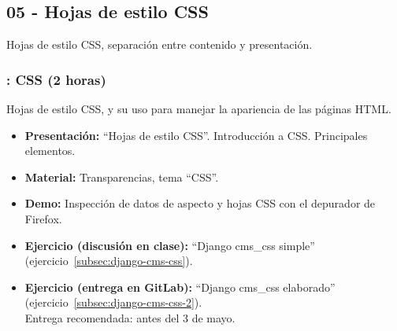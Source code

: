 \documentclass[a4paper,12pt]{article}
\begin{document}
%
%
%
%
\subsection{05 - Hojas de estilo CSS}

Hojas de estilo CSS, separación entre contenido y presentación.

\subsubsection{\martesM: CSS (2 horas)}
\label{cal:martesM}

Hojas de estilo CSS, y su uso para manejar la apariencia de las páginas HTML.

\begin{itemize}
\item \textbf{Presentación:} ``Hojas de estilo CSS''. Introducción a CSS. Principales elementos.
 \item \textbf{Material:} Transparencias, tema ``CSS''.
\item \textbf{Demo:} Inspección de datos de aspecto y hojas CSS con el depurador de Firefox.
\item \textbf{Ejercicio (discusión en clase):} ``Django cms\_css simple'' (ejercicio~\ref{subsec:django-cms-css}).
\item \textbf{Ejercicio (entrega en GitLab):} ``Django cms\_css elaborado'' (ejercicio~\ref{subsec:django-cms-css-2}). \\
  Entrega recomendada: antes del 3 de mayo.
\end{itemize}
\end{document}
